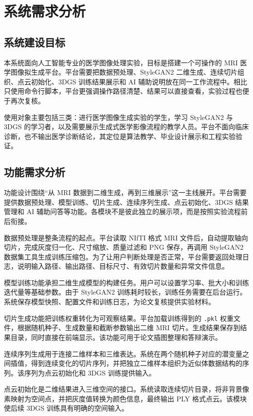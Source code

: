 \chapter{系统需求分析}

\section{系统建设目标}
本系统面向人工智能专业的医学图像处理实验，目标是搭建一个可操作的 MRI 医学图像拟生成平台。平台需要把数据预处理、StyleGAN2 二维生成、连续切片组织、点云初始化、3DGS 训练结果展示和 AI 辅助说明放在同一工作流程中。相比只使用命令行脚本，平台更强调操作路径清楚、结果可以直接查看，实验过程也便于再次复核。

使用对象主要包括三类：进行医学图像生成实验的学生，学习 StyleGAN2 与 3DGS 的学习者，以及需要展示生成式医学影像流程的教学人员。平台不面向临床诊断，也不输出医学诊断结论，其定位是算法教学、毕业设计展示和工程实验验证。

\section{功能需求分析}
功能设计围绕“从 MRI 数据到二维生成，再到三维展示”这一主线展开。平台需要提供数据预处理、模型训练、切片生成、连续序列生成、点云初始化、3DGS 结果管理和 AI 辅助问答等功能。各模块不是彼此独立的展示项，而是按照实验流程前后衔接。

数据预处理是整条流程的起点。平台读取 NIfTI 格式 MRI 文件后，自动提取轴向切片，完成灰度归一化、尺寸缩放、质量过滤和 PNG 保存，再调用 StyleGAN2 数据集工具生成训练压缩包。为了让用户判断处理是否正常，平台需要返回处理日志，说明输入路径、输出路径、目标尺寸、有效切片数量和异常文件信息。

模型训练功能承担二维生成模型的构建任务。用户可以设置学习率、批大小和训练迭代量等基础参数。由于 StyleGAN2 训练耗时较长，训练任务需要在后台运行。系统保存模型快照、配置文件和训练日志，为论文复核提供实验材料。

切片生成功能把训练权重转化为可观察结果。平台加载训练得到的 \texttt{.pkl} 权重文件，根据随机种子、生成数量和截断参数输出二维 MRI 切片。生成结果保存到结果目录，同时直接在前端显示。该功能可用于论文插图整理和答辩演示。

连续序列生成用于连接二维样本和三维表达。系统在两个随机种子对应的潜变量之间插值，得到连续变化的切片序列，并把独立二维样本组织为近似体数据结构的序列。该序列为点云初始化和 3DGS 训练提供输入。

点云初始化是二维结果进入三维空间的接口。系统读取连续切片目录，将非背景像素映射为空间点，并把灰度值转换为颜色信息，最终输出 PLY 格式点云。该模块使后续 3DGS 训练具有明确的空间输入。

